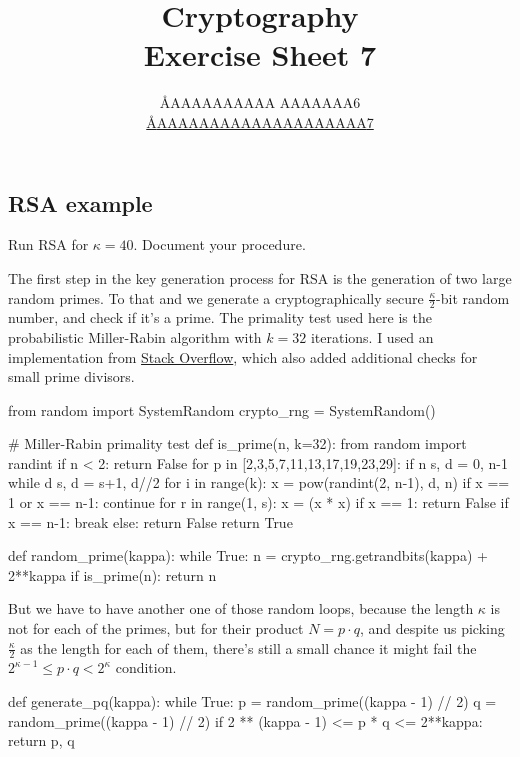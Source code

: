 \documentclass{article}
\title{Cryptography \\ Exercise Sheet 7}
\author{
  \AA{AAAAAAAAAA AAAAAAA}{6} \\
  \href{mailto:\AA{AAAAAAAAAAAAAAAAAAAA}{7}}{\AA{AAAAAAAAAAAAAAAAAAAA}{7}}
}
\begin{document}
  \maketitle

  \setcounter{section}{7}
  \subsection{RSA example}
  \begin{centerframebox}
    Run RSA for $\kappa = 40$. Document your procedure.
  \end{centerframebox}
  The first step in the key generation process for RSA is the generation of two large random primes.
  To that and we generate a cryptographically secure $\frac{\kappa}{2}$-bit random number,
  and check if it's a prime.
  The primality test used here is the probabilistic Miller-Rabin algorithm with $k=32$ iterations.
  I used an implementation from \href{https://stackoverflow.com/a/36525088}{Stack Overflow},
  which also added additional checks for small prime divisors.
  \begin{mylisting}
    from random import SystemRandom
    crypto_rng = SystemRandom()

    # Miller-Rabin primality test
    def is_prime(n, k=32):
        from random import randint
        if n < 2: return False
        for p in [2,3,5,7,11,13,17,19,23,29]:
            if n %
        s, d = 0, n-1
        while d %
            s, d = s+1, d//2
        for i in range(k):
            x = pow(randint(2, n-1), d, n)
            if x == 1 or x == n-1: continue
            for r in range(1, s):
                x = (x * x) %
                if x == 1: return False
                if x == n-1: break
            else: return False
        return True

    def random_prime(kappa):
        while True:
            n = crypto_rng.getrandbits(kappa) + 2**kappa
            if is_prime(n):
                return n
  \end{mylisting}

  But we have to have another one of those random loops, because the length $\kappa$ is not for each of the primes,
  but for their product $N = p\cdot q$, and despite us picking $\frac{\kappa}{2}$ as the length for each of them,
  there's still a small chance it might fail the $2^{\kappa-1} \leq p\cdot q < 2^\kappa$ condition.
  \begin{mylisting}
    def generate_pq(kappa):
        while True:
            p = random_prime((kappa - 1) // 2)
            q = random_prime((kappa - 1) // 2)
            if 2 ** (kappa - 1) <= p * q <= 2**kappa:
                return p, q
  \end{mylisting}
\end{document}
